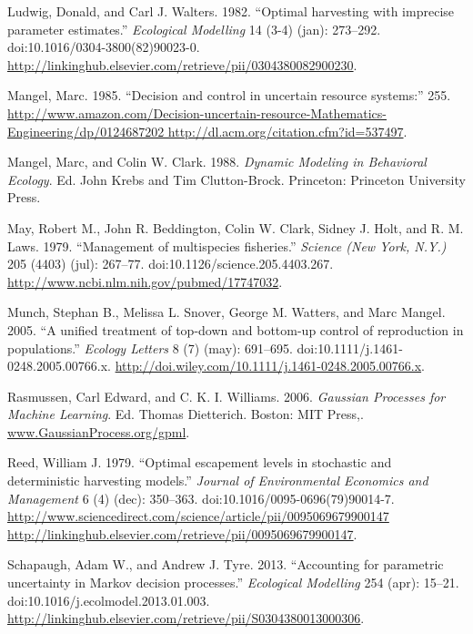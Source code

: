 \documentclass[author-year, review]{elsarticle} %
\begin{document}
Ludwig, Donald, and Carl J. Walters. 1982. ``Optimal harvesting with
imprecise parameter estimates.'' \emph{Ecological Modelling} 14 (3-4)
(jan): 273--292. doi:10.1016/0304-3800(82)90023-0.
\url{http://linkinghub.elsevier.com/retrieve/pii/0304380082900230}.

Mangel, Marc. 1985. ``Decision and control in uncertain resource
systems:'' 255.
\href{http://www.amazon.com/Decision-uncertain-resource-Mathematics-Engineering/dp/0124687202 http://dl.acm.org/citation.cfm?id=537497}{http://www.amazon.com/Decision-uncertain-resource-Mathematics-Engineering/dp/0124687202
http://dl.acm.org/citation.cfm?id=537497}.

Mangel, Marc, and Colin W. Clark. 1988. \emph{Dynamic Modeling in
Behavioral Ecology}. Ed. John Krebs and Tim Clutton-Brock. Princeton:
Princeton University Press.

May, Robert M., John R. Beddington, Colin W. Clark, Sidney J. Holt, and
R. M. Laws. 1979. ``Management of multispecies fisheries.''
\emph{Science (New York, N.Y.)} 205 (4403) (jul): 267--77.
doi:10.1126/science.205.4403.267.
\url{http://www.ncbi.nlm.nih.gov/pubmed/17747032}.

Munch, Stephan B., Melissa L. Snover, George M. Watters, and Marc
Mangel. 2005. ``A unified treatment of top-down and bottom-up control of
reproduction in populations.'' \emph{Ecology Letters} 8 (7) (may):
691--695. doi:10.1111/j.1461-0248.2005.00766.x.
\url{http://doi.wiley.com/10.1111/j.1461-0248.2005.00766.x}.

Rasmussen, Carl Edward, and C. K. I. Williams. 2006. \emph{Gaussian
Processes for Machine Learning}. Ed. Thomas Dietterich. Boston: MIT
Press,. \url{www.GaussianProcess.org/gpml}.

Reed, William J. 1979. ``Optimal escapement levels in stochastic and
deterministic harvesting models.'' \emph{Journal of Environmental
Economics and Management} 6 (4) (dec): 350--363.
doi:10.1016/0095-0696(79)90014-7.
\href{http://www.sciencedirect.com/science/article/pii/0095069679900147 http://linkinghub.elsevier.com/retrieve/pii/0095069679900147}{http://www.sciencedirect.com/science/article/pii/0095069679900147
http://linkinghub.elsevier.com/retrieve/pii/0095069679900147}.

Schapaugh, Adam W., and Andrew J. Tyre. 2013. ``Accounting for
parametric uncertainty in Markov decision processes.'' \emph{Ecological
Modelling} 254 (apr): 15--21. doi:10.1016/j.ecolmodel.2013.01.003.
\url{http://linkinghub.elsevier.com/retrieve/pii/S0304380013000306}.
\end{document}
